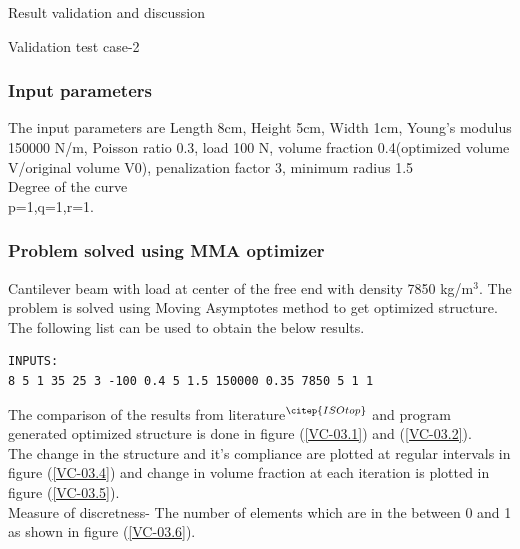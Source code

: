 \documentclass[a4paper,12pt,times]{article}
\begin{document}
\begin{section}{Result validation and discussion}
\begin{subsection}{Validation test case-2}
\subsubsection{Input parameters}
The input parameters are Length 8cm, Height 5cm, Width 1cm, Young's modulus 150000 N/m, Poisson ratio 0.3, load 100 N, volume fraction 0.4(optimized volume V/original volume V0), penalization factor 3, minimum radius 1.5 \\ 
Degree of the curve\\
p=1,q=1,r=1.

\subsubsection{Problem solved using MMA optimizer}
Cantilever beam with load at center of the free end with density 7850 kg/m$^3$. The problem is solved using Moving Asymptotes method to get optimized structure. The following list can be used to obtain the below results.\\
\begin{lstlisting}
INPUTS:
8 5 1 35 25 3 -100 0.4 5 1.5 150000 0.35 7850 5 1 1
\end{lstlisting}
The comparison of the results from literature$^{\citep{ISOtop}}$ and program generated optimized structure is done in figure (\ref{VC-03.1}) and (\ref{VC-03.2}).\\
The change in the structure and it's compliance are plotted at regular intervals in figure (\ref{VC-03.4}) and change in volume fraction at each iteration is plotted in figure (\ref{VC-03.5}).\\
Measure of discretness- The number of elements which are in the between 0 and 1 as shown in figure (\ref{VC-03.6}).\\
 

\end{subsection}
\end{section}
\end{document}
